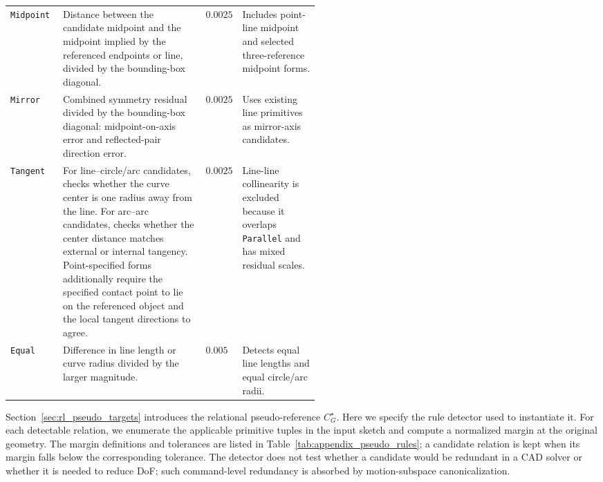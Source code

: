\begin{table}[t]
\begin{tabularx}{\linewidth}{@{}>{\raggedright\arraybackslash}p{0.17\linewidth}>{\raggedright\arraybackslash}X>{\raggedright\arraybackslash}p{0.10\linewidth}>{\raggedright\arraybackslash}p{0.25\linewidth}@{}}
        \texttt{Midpoint}
        & Distance between the candidate midpoint and the midpoint implied by the referenced endpoints or line, divided by the bounding-box diagonal.
        & $0.0025$
        & Includes point-line midpoint and selected three-reference midpoint forms. \\

        \texttt{Mirror}
        & Combined symmetry residual divided by the bounding-box diagonal: midpoint-on-axis error and reflected-pair direction error.
        & $0.0025$
        & Uses existing line primitives as mirror-axis candidates. \\

        \texttt{Tangent}
        & For line--circle/arc candidates, checks whether the curve center is one radius away from the line. For arc--arc candidates, checks whether the center distance matches external or internal tangency. Point-specified forms additionally require the specified contact point to lie on the referenced object and the local tangent directions to agree.
        & $0.0025$
        & Line-line collinearity is excluded because it overlaps \texttt{Parallel} and has mixed residual scales. \\

        \texttt{Equal}
        & Difference in line length or curve radius divided by the larger magnitude.
        & $0.005$
        & Detects equal line lengths and equal circle/arc radii. \\
        \bottomrule
    \end{tabularx}
\end{table}

Section~\ref{sec:rl_pseudo_targets} introduces the relational pseudo-reference $C_G^\star$. Here we specify the rule detector used to instantiate it. For each detectable relation, we enumerate the applicable primitive tuples in the input sketch and compute a normalized margin at the original geometry. The margin definitions and tolerances are listed in Table~\ref{tab:appendix_pseudo_rules}; a candidate relation is kept when its margin falls below the corresponding tolerance. The detector does not test whether a candidate would be redundant in a CAD solver or whether it is needed to reduce DoF; such command-level redundancy is absorbed by motion-subspace canonicalization.

